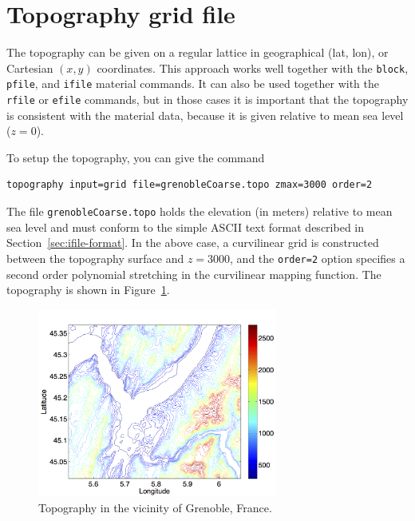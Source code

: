 \documentclass[11pt]{report}
\begin{document}
\section{Topography grid file}\label{sec:topo-gridfile}
The topography can be given on a regular lattice in geographical (lat, lon), or Cartesian $(x, y)$
coordinates. This approach works well together with the \verb+block+, \verb+pfile+, and \verb+ifile+
material commands. It can also be used together with the \verb+rfile+ or \verb+efile+ commands, but
in those cases it is important that the topography is consistent with the material data, because it
is given relative to mean sea level ($z=0$).

To setup the topography, you can give the command
\begin{verbatim}
topography input=grid file=grenobleCoarse.topo zmax=3000 order=2
\end{verbatim}
The file \verb+grenobleCoarse.topo+ holds the elevation (in meters) relative to mean sea level and
must conform to the simple ASCII text format described in Section~\ref{sec:ifile-format}. In the
above case, a curvilinear grid is constructed between the topography surface and $z=3000$, and the
\verb+order=2+ option specifies a second order polynomial stretching in the curvilinear mapping
function. The topography is shown in Figure~\ref{fig:grenoble-topo}.
%
\begin{figure}[htp]
  \begin{center}
    \includegraphics[width=0.7\textwidth]{figures/grenoble-topo.png}
    \caption{Topography in the vicinity of Grenoble, France.}
    \label{fig:grenoble-topo}
  \end{center}
\end{figure}
\end{document}
